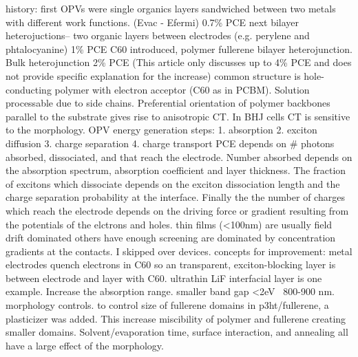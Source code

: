 \documentclass{article}
\begin{document}
history: 
first OPVs were single organics layers sandwiched between two metals with different work functions. (Evac - Efermi) 0.7\% PCE
next bilayer heterojuctions-- two organic layers between electrodes (e.g. perylene and phtalocyanine) 1\% PCE
C60 introduced, polymer fullerene bilayer heterojunction.
Bulk heterojunction 2\% PCE
(This article only discusses up to 4\% PCE and does not provide specific explanation for the increase)
common structure is hole-conducting polymer with electron acceptor (C60 as in PCBM). Solution processable due to side chains. Preferential orientation of polymer backbones parallel to the substrate gives rise to anisotropic CT. In BHJ cells CT is sensitive to the morphology.
OPV energy generation steps: 
1. absorption
2. exciton diffusion
3. charge separation
4. charge transport
PCE depends on # photons absorbed, dissociated, and that reach the electrode. Number absorbed depends on the absorption spectrum, absorption coefficient and layer thickness. The fraction of excitons which dissociate depends on the exciton dissociation length and the charge separation probability at the interface. Finally the the number of charges which reach the electrode depends on the driving force or gradient resulting from the potentials of the elctrons and holes. thin films (<100nm) are usually field drift dominated others have enough screening are dominated by concentration gradients at the contacts.
I skipped over devices.
concepts for improvement:
metal electrodes quench electrons in C60 so an transparent, exciton-blocking layer is between electrode and layer with C60. ultrathin LiF interfacial layer is one example. 
Increase the absorption range. smaller band gap <2eV ~800-900 nm.
morphology controls. to control size of fullerene domains in p3ht/fullerene, a plasticizer was added. This increase miscibility of polymer and fullerene creating smaller domains. Solvent/evaporation time, surface interaction, and annealing all have a large effect of the morphology.
\end{document}
